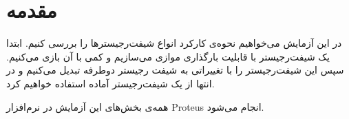 \documentclass[a4paper,oneside,12pt]{book}
\title{\thesistitle}
\author{\authorname}
\begin{document}

\doublespacing


\chapter{مقدمه}
در این آزمایش می‌خواهیم نحوه‌ی کارکرد انواع شیفت‌رجیسترها را بررسی کنیم.
ابتدا یک شیفت‌رجیستر با قابلیت بارگذاری موازی می‌سازیم و کمی با آن بازی می‌کنیم.
سپس این شیفت‌رجیستر را با تغییراتی به شیفت رجیستر دوطرفه تبدیل می‌کنیم و در انتها از یک شیفت‌رجیستر آماده استفاده خواهیم کرد.

همه‌ی بخش‌های این آزمایش در نرم‌افزار
Proteus
انجام می‌شود.

\newpage
\tableofcontents
\newpage

\mainmatter


\renewcommand{\thechapter}{A\arabic{chapter}}
%
\end{document}
